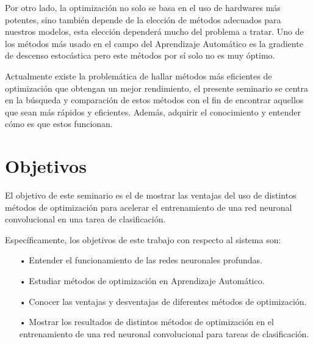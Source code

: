 Por otro lado, la optimización no solo se basa en el uso de hardwares más potentes, sino también depende de la elección de métodos adecuados para nuestros modelos, esta elección dependerá mucho del problema a tratar. Uno de los métodos más usado en el campo del Aprendizaje Automático es la gradiente de descenso estocástica pero este métodos por sí solo no es muy óptimo. 

Actualmente existe la problemática de hallar métodos más eficientes de optimización que obtengan un mejor rendimiento, el presente seminario se centra en la búsqueda y comparación de estos métodos con el fin de encontrar aquellos que sean más rápidos y eficientes. Además, adquirir el conocimiento y entender cómo es que estos funcionan.


\section{Objetivos}

El objetivo de este seminario es el de mostrar las ventajas del uso de distintos métodos de optimización para acelerar el entrenamiento de una red neuronal convolucional en una tarea de clasificación.

Específicamente, los objetivos de este trabajo con respecto al sistema son:

\begin{itemize}
\item[•] Entender el funcionamiento de las redes neuronales profundas.%

\item[•] Estudiar métodos de optimización en Aprendizaje Automático.

\item[•] Conocer las ventajas y desventajas de diferentes métodos de optimización.
\item[•] Mostrar los resultados de distintos métodos de optimización en el entrenamiento de una red neuronal convolucional para tareas de clasificación.



\end{itemize}

